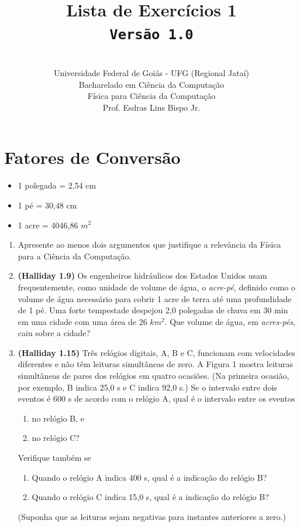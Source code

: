 \documentclass[12pt,a4paper,oneside]{article}
\author{\\Universidade Federal de Goiás - UFG (Regional Jataí) \\Bacharelado em Ciência da Computação \\Física para Ciência da Computação \\Prof. Esdras Lins Bispo Jr.}
\title{
	{\sc \huge Lista de Exercícios 1} 
	\\{\tt Versão 1.0}
}
\begin{document}
\maketitle


\section{Fatores de Conversão}
	\begin{itemize}
		\item 1 polegada = 2,54 cm
		\item 1 pé = 30,48 cm
		\item 1 acre = 4046,86 $m^2$
	\end{itemize}

\begin{enumerate}

\section{Conceitos}

	\item Apresente ao menos dois argumentos que justifique a relevância da Física para a Ciência da Computação.
	
	\item {\bf (Halliday 1.9)} Os engenheiros hidráulicos dos Estados Unidos usam frequentemente, como unidade de volume de água, o {\it acre-pé}, definido como o volume de água necessário para cobrir 1 acre de terra até uma profundidade de 1 pé. Uma forte tempestade despejou 2,0 polegadas de chuva em 30 min em uma cidade com uma área de 26 $km^2$. Que volume de água, em {\it acres-pés}, caiu sobre a cidade?
	
	\item {\bf (Halliday 1.15)} Três relógios digitais, A, B e C, funcionam com velocidades diferentes e não têm leituras simultâneas de zero. A Figura 1 mostra leituras simultâneas de pares dos relógios em quatro ocasiões. (Na primeira ocasião, por exemplo, B indica 25,0 s e C indica 92,0 s.) Se o intervalo entre dois eventos é 600 s de acordo com o relógio A, qual é o intervalo entre os eventos 
		\begin{enumerate}
			\item no relógio B, e
			\item no relógio C?
		\end{enumerate}
	Verifique também se
		\begin{enumerate}
			\item Quando o relógio A indica 400 s, qual é a indicação do relógio B?
			\item Quando o relógio C indica 15,0 s, qual é a indicação do relógio B?
		\end{enumerate}
	(Suponha que as leituras sejam negativas para instantes anteriores a zero.)
	

\end{enumerate}
\end{document}
